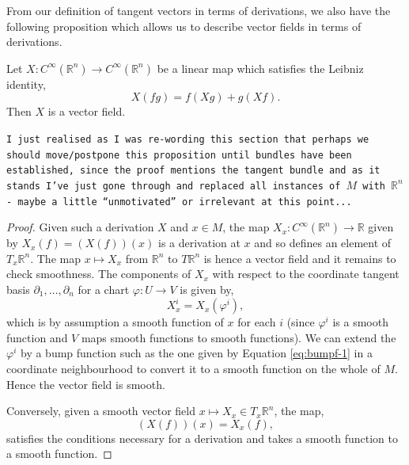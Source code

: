 From our definition of tangent vectors in terms of derivations, we also have the following proposition which allows us to describe vector fields in terms of derivations.
\begin{proposition}
Let $X:C^{\infty}(\mathbb{R}^n)\to C^{\infty}(\mathbb{R}^n)$ be a linear map which satisfies the Leibniz identity,
\[
X(fg)=f(Xg)+g(Xf).
\]
Then $X$ is a vector field.
\end{proposition}
\texttt{I just realised as I was re-wording this section that perhaps we should move/postpone this proposition until bundles have been established, since the proof mentions the tangent bundle and as it stands I've just gone through and replaced all instances of $M$ with $\mathbb{R}^n$ - maybe a little ``unmotivated'' or irrelevant at this point...}
\begin{proof}
Given such a derivation $X$ and $x\in M$, the map $X_x:C^{\infty}(\mathbb{R}^n)\to\mathbb{R}$ given by $X_x(f)=(X(f))(x)$ is a derivation at $x$ and so defines an element of $T_x\mathbb{R}^n$. The map $x\mapsto X_x$ from $\mathbb{R}^n$ to $T\mathbb{R}^n$ is hence a vector field and it remains to check smoothness. The components of $X_x$ with respect to the coordinate tangent basis $\partial_1,\ldots,\partial_n$ for a chart $\varphi:U\to V$ is given by,
\[
X_x^i=X_x(\varphi^i),
\]
which is by assumption a smooth function of $x$ for each $i$ (since $\varphi^i$ is a smooth function and $V$ maps smooth functions to smooth functions). We can extend the $\varphi^i$ by a bump function such as the one given by Equation \eqref{eq:bumpf-1} in a coordinate neighbourhood to convert it to a smooth function on the whole of $M$. Hence the vector field is smooth.

Conversely, given a smooth vector field $x\mapsto X_x\in T_x\mathbb{R}^n$, the map,
\[
(X(f))(x)=X_x(f),
\] 
satisfies the conditions necessary for a derivation and takes a smooth function to a smooth function.
%
\end{proof}

